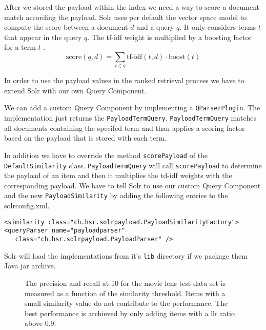 After we stored the payload within the index we need a way to score a document match according the payload.
Solr uses per default the vector space model to compute the score between a document $d$ and a query $q$. It only considers terms $t$ that appear in the query $q$. The tf-idf weight is multiplied by a boosting factor for a term $t$ \cite{grainger}.  
\begin{equation}
\label{eq:solrsim}
\text{score}(q,d) = \sum_{t \in q} \text{tf-idf}(t,d) \cdot \text{boost}(t)
\end{equation}

In order to use the payload values in the ranked retrieval process we have to extend Solr with our own Query Component. 

We can add a custom Query Component by implementing a \verb|QParserPlugin|. The implementation just returns the \verb|PayloadTermQuery|. \verb|PayloadTermQuery| matches all documents containing the specifed term and than applies a scoring factor based on the payload that is stored with each term.

In addition we have to override the method \verb|scorePayload| of the \\ \verb|DefaultSimilarity| class. \verb|PayloadTermQuery| will call \verb|scorePayload| to determine the payload of an item and then it multiplies the td-idf weights with the corresponding payload. We have to tell Solr to use our custom Query Component and the new \verb|PayloadSimilarity| by adding the following entries to the solrconfig.xml.

\begin{lstlisting}
<similarity class="ch.hsr.solrpayload.PayloadSimilarityFactory">
<queryParser name="payloadparser" 
   class="ch.hsr.solrpayload.PayloadParser" />
\end{lstlisting}
  
Solr will load the implementations from it's \verb|lib| directory if we package them Java jar archive.


\begin{figure}
  \centering
{}
\caption{The precision and recall at 10 for the movie lens test data set is measured as a function of the similarity threshold. Items with a small similarity value do not contribute to the performance. The best performance is archieved by only adding items with a \gls{llr} ratio above 0.9.}
\label{fig:threshold}
\end{figure}

